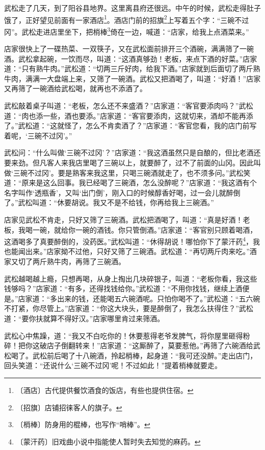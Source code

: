 \documentclass[12pt,UTF-8,openany]{ctexbook}
\begin{document}
\begin{Large}
    
    武松走了几天，到了阳谷县地界。这里离县府还很远。中午的时候，武松走得肚子饿了，正好望见前面有一家酒店\footnote{〔酒店〕古代提供餐饮酒食的饭店，有些也提供住宿。}。酒店门前的招旗\footnote{〔招旗〕店铺招徕客人的旗子。}上写着五个字：“三碗不过冈”。武松走进店里坐下，把梢棒\footnote{〔梢棒〕防身用的棍棒，也写作“哨棒”。}倚在一边，喊道：“店家，给我上点酒菜来。”
    
    店家很快上了一碟热菜、一双筷子，又在武松面前排开三个酒碗，满满筛了一碗酒。武松拿起碗，一饮而尽，叫道：“这酒真够劲！老板，来点下酒的好菜。”店家道：“只有熟牛肉。”武松道：“切两三斤好肉，给我下酒。”店家就到后面切了两斤熟牛肉，满满一大盘端上来，又筛了一碗酒。武松又把酒喝了，叫道：“好酒！”店家又再筛了一碗酒给武松喝，就再也不添酒了。
    
    武松敲着桌子叫道：“老板，怎么还不来盛酒？”店家道：“客官要添肉吗？”武松道：“肉也添一些，酒也要添。”店家道：“客官要添肉，这就切来，酒却不能再添了。”武松道：“这就怪了，怎么不肯卖酒了？”店家道：“客官您看，我的店门前写着呢，‘三碗不过冈’。”
    
    武松问：“什么叫做‘三碗不过冈’？”店家道：“我这酒虽然只是自酿的，但比老酒还要来劲。但凡客人来我店里喝了三碗以上，就要醉了，过不了前面的山冈。因此叫做‘三碗不过冈’。要是熟客来我这里，只喝三碗酒就走了，也不须多问。”武松笑道：“原来是这么回事。我已经喝了三碗酒，怎么没醉呢？”店家道：“我这酒有个名字叫作‘透瓶香’，又叫‘出门倒’，刚入口的时候醇香好喝，过一会儿就醉倒了。”武松叫道：“休要胡说。我又不是不给钱，你再给我上三碗酒。”
    
    店家见武松不肯走，只好又筛了三碗酒。武松把酒喝了，叫道：“真是好酒！老板，我喝一碗，就给你一碗的酒钱。你只管倒酒。”店家道：“客官别只顾着喝酒，这酒喝多了真要醉倒的，没药医。”武松叫道：“休得胡说！哪怕你下了蒙汗药\footnote{〔蒙汗药〕旧戏曲小说中指能使人暂时失去知觉的麻药。}，我也能闻出来。”店家拗不过他，只好又筛了三碗酒。武松道：“再切两斤肉来吃。”酒家又切了两斤熟牛肉，再筛了三碗酒。
    
    武松越喝越上瘾，只想再喝，从身上掏出几块碎银子，叫道：“老板你看，我这些钱够吗？”店家道：“有多，还得找钱给你。”武松道：“不用你找钱，继续上酒便是。”店家道：“多出来的钱，还能喝五六碗酒呢。只怕你喝不了。”武松道：“五六碗不打紧，你尽管上。”店家道：“你这大块头，要是醉倒了，我怎么扶得住？”武松道：“要你扶就算不得好汉。”店家哪里肯过来筛酒。
    
    武松心中焦躁，道：“我又不白吃你的！休要惹得老爷发脾气，将你屋里砸得粉碎！把你这破店子倒翻转来！”店家道：“这厮醉了，莫要惹他。”再筛了六碗酒给武松喝了。武松前后喝了十八碗酒，拎起梢棒，起身道：“我可还没醉。”走出店门，回头笑道：“还说什么‘三碗不过冈’呢！不过如此！”提着梢棒就要走。
    

\end{Large}
\end{document}
